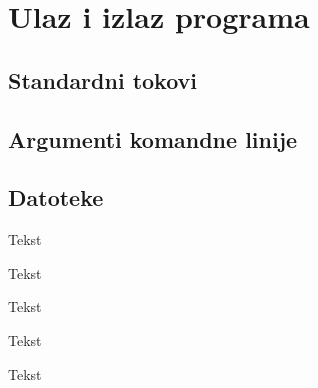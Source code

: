 
\chapter{Ulaz i izlaz programa}

\section{Standardni tokovi}

\section{Argumenti komandne linije}

\section{Datoteke}

\begin{Exercise}[label=v3_01] 
Tekst
\end{Exercise}
\begin{Answer}[ref=v3_01]
\end{Answer}

\begin{Exercise}[label=v3_02] 
Tekst
\end{Exercise}
\begin{Answer}[ref=v3_02]
\end{Answer}

\begin{Exercise}[label=v3_03] 
Tekst
\end{Exercise}
\begin{Answer}[ref=v3_03]
\end{Answer}

\begin{Exercise}[label=v3_04] 
Tekst
\end{Exercise}
\begin{Answer}[ref=v3_04]
\end{Answer}

\begin{Exercise}[label=v3_05] 
Tekst
\end{Exercise}
\begin{Answer}[ref=v3_05]
\end{Answer}

